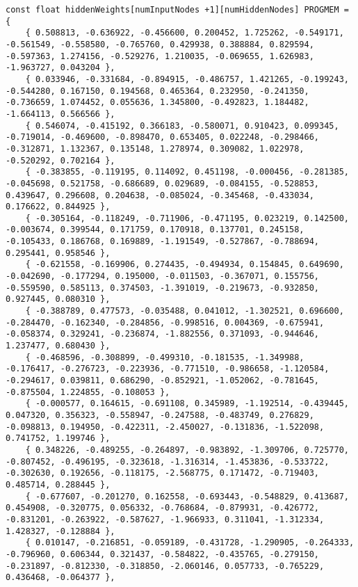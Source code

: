 \documentclass[a4paper]{article}
\begin{document}
\begin{lstlisting}
const float hiddenWeights[numInputNodes +1][numHiddenNodes] PROGMEM = {
    { 0.508813, -0.636922, -0.456600, 0.200452, 1.725262, -0.549171, -0.561549, -0.558580, -0.765760, 0.429938, 0.388884, 0.829594, -0.597363, 1.274156, -0.529276, 1.210035, -0.069655, 1.626983, -1.963727, 0.043204 }, 
    { 0.033946, -0.331684, -0.894915, -0.486757, 1.421265, -0.199243, -0.544280, 0.167150, 0.194568, 0.465364, 0.232950, -0.241350, -0.736659, 1.074452, 0.055636, 1.345800, -0.492823, 1.184482, -1.664113, 0.566566 }, 
    { 0.546074, -0.415192, 0.366183, -0.580071, 0.910423, 0.099345, -0.719014, -0.469600, -0.898470, 0.653405, 0.022248, -0.298466, -0.312871, 1.132367, 0.135148, 1.278974, 0.309082, 1.022978, -0.520292, 0.702164 }, 
    { -0.383855, -0.119195, 0.114092, 0.451198, -0.000456, -0.281385, -0.045698, 0.521758, -0.686689, 0.029689, -0.084155, -0.528853, 0.439647, 0.296608, 0.204638, -0.085024, -0.345468, -0.433034, 0.176622, 0.844925 }, 
    { -0.305164, -0.118249, -0.711906, -0.471195, 0.023219, 0.142500, -0.003674, 0.399544, 0.171759, 0.170918, 0.137701, 0.245158, -0.105433, 0.186768, 0.169889, -1.191549, -0.527867, -0.788694, 0.295441, 0.958546 }, 
    { -0.621558, -0.169906, 0.274435, -0.494934, 0.154845, 0.649690, -0.042690, -0.177294, 0.195000, -0.011503, -0.367071, 0.155756, -0.559590, 0.585113, 0.374503, -1.391019, -0.219673, -0.932850, 0.927445, 0.080310 }, 
    { -0.388789, 0.477573, -0.035488, 0.041012, -1.302521, 0.696600, -0.284470, -0.162340, -0.284856, -0.998516, 0.004369, -0.675941, -0.058374, 0.329241, -0.236874, -1.882556, 0.371093, -0.944646, 1.237477, 0.680430 }, 
    { -0.468596, -0.308899, -0.499310, -0.181535, -1.349988, -0.176417, -0.276723, -0.223936, -0.771510, -0.986658, -1.120584, -0.294617, 0.039811, 0.686290, -0.852921, -1.052062, -0.781645, -0.875504, 1.224855, -0.108053 }, 
    { -0.000577, 0.164615, -0.691108, 0.345989, -1.192514, -0.439445, 0.047320, 0.356323, -0.558947, -0.247588, -0.483749, 0.276829, -0.098813, 0.194950, -0.422311, -2.450027, -0.131836, -1.522098, 0.741752, 1.199746 }, 
    { 0.348226, -0.489255, -0.264897, -0.983892, -1.309706, 0.725770, -0.807452, -0.496195, -0.323618, -1.316314, -1.453836, -0.533722, -0.302630, 0.192656, -0.118175, -2.568775, 0.171472, -0.719403, 0.485714, 0.288445 }, 
    { -0.677607, -0.201270, 0.162558, -0.693443, -0.548829, 0.413687, 0.454908, -0.320775, 0.056332, -0.768684, -0.879931, -0.426772, -0.831201, -0.263922, -0.587627, -1.966933, 0.311041, -1.312334, 1.428327, -0.128884 }, 
    { 0.010147, -0.216851, -0.059189, -0.431728, -1.290905, -0.264333, -0.796960, 0.606344, 0.321437, -0.584822, -0.435765, -0.279150, -0.231897, -0.812330, -0.318850, -2.060146, 0.057733, -0.765229, 0.436468, -0.064377 }, 

\end{lstlisting}
\end{document}
